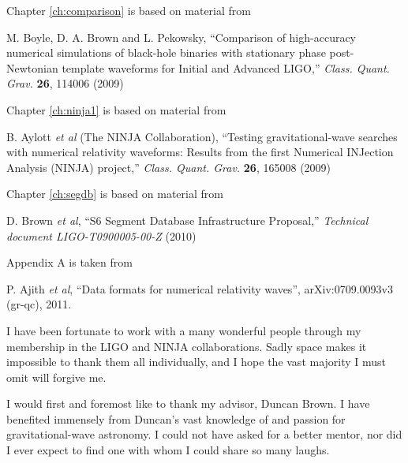 \documentclass[12pt,notitlepage]{report}
\begin{document}
\vspace*{0.5cm}

\noindent Chapter \ref{ch:comparison} is based on material from

\vspace*{0.25cm}

\noindent M. Boyle, D. A. Brown and L. Pekowsky, ``Comparison of high-accuracy
numerical simulations of black-hole binaries with stationary phase
post-Newtonian template waveforms for Initial and Advanced LIGO,''
{\it Class. Quant. Grav.} {\bf 26}, 114006 (2009)

\vspace*{0.5cm}

\noindent Chapter \ref{ch:ninja1} is based on material from

\vspace*{0.25cm}

\noindent B. Aylott {\it et al} (The NINJA Collaboration), ``Testing
gravitational-wave searches with numerical relativity waveforms:
Results from the first Numerical INJection Analysis (NINJA) project,''
{\it Class. Quant. Grav.} {\bf 26}, 165008 (2009)


\vspace*{0.5cm}

\noindent Chapter \ref{ch:segdb} is based on material from

\vspace*{0.25cm}

\noindent D. Brown {\it et al}, ``S6 Segment Database
Infrastructure Proposal,'' {\it Technical document
{LIGO}-T0900005-00-Z} (2010)


\vspace*{0.5cm}

\noindent Appendix A is taken from

\vspace*{0.25cm}

\noindent P. Ajith {\it et al}, ``Data formats for numerical
relativity waves'', arXiv:0709.0093v3 (gr-qc), 2011.


I have been fortunate to work with a many wonderful people through my
membership in the LIGO and NINJA collaborations.  Sadly space makes it
impossible to thank them all individually, and I hope the vast
majority I must omit will forgive me.

I would first and foremost like to thank my advisor, Duncan Brown.  I
have benefited immensely from Duncan's vast knowledge of and passion
for gravitational-wave astronomy.  I could not have asked for a better
mentor, nor did I ever expect to find one with whom I could share so
many laughs.
\end{document}
